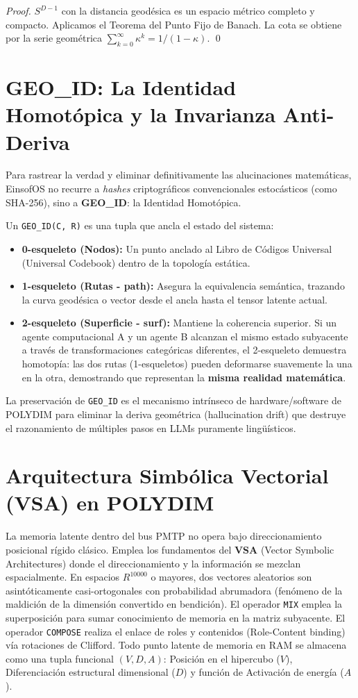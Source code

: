 \begin{proof}
$S^{D-1}$ con la distancia geodésica es un espacio métrico completo y 
compacto. Aplicamos el Teorema del Punto Fijo de Banach.
La cota se obtiene por la serie geométrica 
$\sum_{k=0}^{\infty} \kappa^k = 1/(1-\kappa)$. \qed
\end{proof}

\section{GEO\_ID: La Identidad Homotópica y la Invarianza Anti-Deriva}
Para rastrear la verdad y eliminar definitivamente las alucinaciones matemáticas, EinsofOS no recurre a \textit{hashes} criptográficos convencionales estocásticos (como SHA-256), sino a \textbf{GEO\_ID}: la Identidad Homotópica. 

Un \texttt{GEO\_ID(C, R)} es una tupla que ancla el estado del sistema:
\begin{itemize}
    \item \textbf{0-esqueleto (Nodos):} Un punto anclado al Libro de Códigos Universal (Universal Codebook) dentro de la topología estática.
    \item \textbf{1-esqueleto (Rutas - path):} Asegura la equivalencia semántica, trazando la curva geodésica o vector desde el ancla hasta el tensor latente actual.
    \item \textbf{2-esqueleto (Superficie - surf):} Mantiene la coherencia superior. Si un agente computacional A y un agente B alcanzan el mismo estado subyacente a través de transformaciones categóricas diferentes, el 2-esqueleto demuestra homotopía: las dos rutas (1-esqueletos) pueden deformarse suavemente la una en la otra, demostrando que representan la \textbf{misma realidad matemática}.
\end{itemize}
La preservación de \texttt{GEO\_ID} es el mecanismo intrínseco de hardware/software de POLYDIM para eliminar la deriva geométrica (hallucination drift) que destruye el razonamiento de múltiples pasos en LLMs puramente lingüísticos.

\section{Arquitectura Simbólica Vectorial (VSA) en POLYDIM}
La memoria latente dentro del bus PMTP no opera bajo direccionamiento posicional rígido clásico. Emplea los fundamentos del \textbf{VSA} (Vector Symbolic Architectures) donde el direccionamiento y la información se mezclan espacialmente. 
En espacios $R^{10000}$ o mayores, dos vectores aleatorios son asintóticamente casi-ortogonales con probabilidad abrumadora (fenómeno de la maldición de la dimensión convertido en bendición). El operador \texttt{MIX} emplea la superposición para sumar conocimiento de memoria en la matriz subyacente. El operador \texttt{COMPOSE} realiza el enlace de roles y contenidos (Role-Content binding) vía rotaciones de Clifford. Todo punto latente de memoria en RAM se almacena como una tupla funcional $(V, D, A)$: Posición en el hipercubo ($V$), Diferenciación estructural dimensional ($D$) y función de Activación de energía ($A$).

